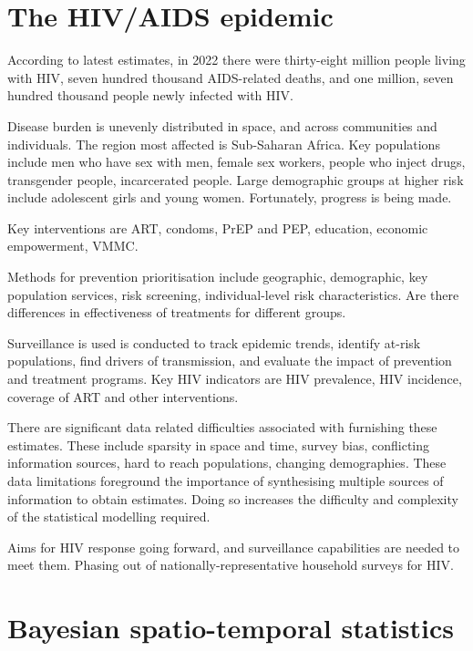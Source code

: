 \documentclass[a4paper, nobind]{templates/ociamthesis}
\begin{document}
\adjustmtc
{}

\hypertarget{the-hivaids-epidemic}{%
\section{The HIV/AIDS epidemic}\label{the-hivaids-epidemic}}

According to latest estimates, in 2022 there were thirty-eight million people living with HIV, seven hundred thousand AIDS-related deaths, and one million, seven hundred thousand people newly infected with HIV.

Disease burden is unevenly distributed in space, and across communities and individuals.
The region most affected is Sub-Saharan Africa.
Key populations include men who have sex with men, female sex workers, people who inject drugs, transgender people, incarcerated people.
Large demographic groups at higher risk include adolescent girls and young women.
Fortunately, progress is being made.

Key interventions are ART, condoms, PrEP and PEP, education, economic empowerment, VMMC.

Methods for prevention prioritisation include geographic, demographic, key population services, risk screening, individual-level risk characteristics.
Are there differences in effectiveness of treatments for different groups.

Surveillance is used is conducted to track epidemic trends, identify at-risk populations, find drivers of transmission, and evaluate the impact of prevention and treatment programs.
Key HIV indicators are HIV prevalence, HIV incidence, coverage of ART and other interventions.

There are significant data related difficulties associated with furnishing these estimates.
These include sparsity in space and time, survey bias, conflicting information sources, hard to reach populations, changing demographies.
These data limitations foreground the importance of synthesising multiple sources of information to obtain estimates.
Doing so increases the difficulty and complexity of the statistical modelling required.

Aims for HIV response going forward, and surveillance capabilities are needed to meet them.
Phasing out of nationally-representative household surveys for HIV.

\hypertarget{bayesian-spatio-temporal-statistics}{%
\section{Bayesian spatio-temporal statistics}\label{bayesian-spatio-temporal-statistics}}
\end{document}
